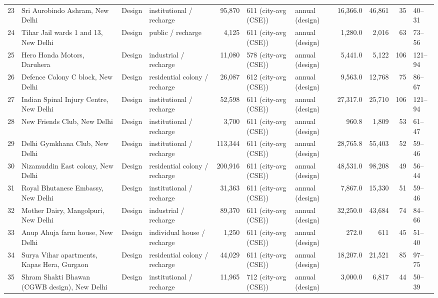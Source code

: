 {\begin{longtable}{l p{2.7cm} l >{\raggedright\arraybackslash}p{1.6cm} r p{1.6cm} p{1.1cm} r r r l}
23 & Sri Aurobindo Ashram, New Delhi & Design & institutional / recharge & 95,870 & 611 (city-avg (CSE)) & annual (design) & 16,366.0 & 46,861 & 35 & 40--31\\
24 & Tihar Jail wards 1 and 13, New Delhi & Design & public / recharge & 4,125 & 611 (city-avg (CSE)) & annual (design) & 1,280.0 & 2,016 & 63 & 73--56\\
25 & Hero Honda Motors, Daruhera & Design & industrial / recharge & 11,080 & 578 (city-avg (CSE)) & annual (design) & 5,441.0 & 5,122 & 106 & 121--94\\
26 & Defence Colony C block, New Delhi & Design & residential colony / recharge & 26,087 & 612 (city-avg (CSE)) & annual (design) & 9,563.0 & 12,768 & 75 & 86--67\\
27 & Indian Spinal Injury Centre, New Delhi & Design & institutional / recharge & 52,598 & 611 (city-avg (CSE)) & annual (design) & 27,317.0 & 25,710 & 106 & 121--94\\
28 & New Friends Club, New Delhi & Design & institutional / recharge & 3,700 & 611 (city-avg (CSE)) & annual (design) & 960.8 & 1,809 & 53 & 61--47\\
29 & Delhi Gymkhana Club, New Delhi & Design & institutional / recharge & 113,344 & 611 (city-avg (CSE)) & annual (design) & 28,765.8 & 55,403 & 52 & 59--46\\
30 & Nizamuddin East colony, New Delhi & Design & residential colony / recharge & 200,916 & 611 (city-avg (CSE)) & annual (design) & 48,531.0 & 98,208 & 49 & 56--44\\
31 & Royal Bhutanese Embassy, New Delhi & Design & institutional / recharge & 31,363 & 611 (city-avg (CSE)) & annual (design) & 7,867.0 & 15,330 & 51 & 59--46\\
32 & Mother Dairy, Mangolpuri, New Delhi & Design & industrial / recharge & 89,370 & 611 (city-avg (CSE)) & annual (design) & 32,250.0 & 43,684 & 74 & 84--66\\
33 & Anup Ahuja farm house, New Delhi & Design & individual house / recharge & 1,250 & 611 (city-avg (CSE)) & annual (design) & 272.0 & 611 & 45 & 51--40\\
34 & Surya Vihar apartments, Kapas Hera, Gurgaon & Design & residential colony / recharge & 44,029 & 611 (city-avg (CSE)) & annual (design) & 18,207.0 & 21,521 & 85 & 97--75\\
35 & Shram Shakti Bhawan (CGWB design), New Delhi & Design & institutional / recharge & 11,965 & 712 (city-avg (CSE)) & annual (design) & 3,000.0 & 6,817 & 44 & 50--39\\
\end{longtable}}

